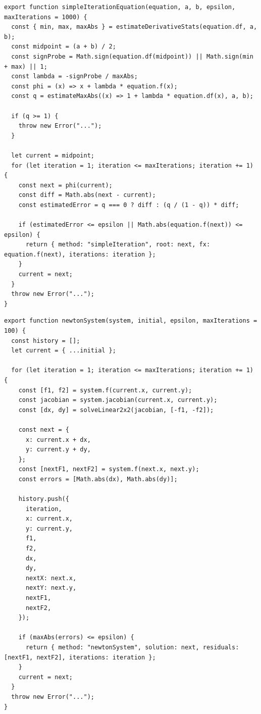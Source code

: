 \documentclass[12pt,a4paper]{article}
\begin{document}
\begin{lstlisting}[caption={Метод простой итерации (фрагмент \texttt{src/methods/equations.js})}]
export function simpleIterationEquation(equation, a, b, epsilon, maxIterations = 1000) {
  const { min, max, maxAbs } = estimateDerivativeStats(equation.df, a, b);
  const midpoint = (a + b) / 2;
  const signProbe = Math.sign(equation.df(midpoint)) || Math.sign(min + max) || 1;
  const lambda = -signProbe / maxAbs;
  const phi = (x) => x + lambda * equation.f(x);
  const q = estimateMaxAbs((x) => 1 + lambda * equation.df(x), a, b);

  if (q >= 1) {
    throw new Error("...");
  }

  let current = midpoint;
  for (let iteration = 1; iteration <= maxIterations; iteration += 1) {
    const next = phi(current);
    const diff = Math.abs(next - current);
    const estimatedError = q === 0 ? diff : (q / (1 - q)) * diff;

    if (estimatedError <= epsilon || Math.abs(equation.f(next)) <= epsilon) {
      return { method: "simpleIteration", root: next, fx: equation.f(next), iterations: iteration };
    }
    current = next;
  }
  throw new Error("...");
}
\end{lstlisting}

\begin{lstlisting}[caption={Метод Ньютона для системы (фрагмент \texttt{src/methods/systems.js})}]
export function newtonSystem(system, initial, epsilon, maxIterations = 100) {
  const history = [];
  let current = { ...initial };

  for (let iteration = 1; iteration <= maxIterations; iteration += 1) {
    const [f1, f2] = system.f(current.x, current.y);
    const jacobian = system.jacobian(current.x, current.y);
    const [dx, dy] = solveLinear2x2(jacobian, [-f1, -f2]);

    const next = {
      x: current.x + dx,
      y: current.y + dy,
    };
    const [nextF1, nextF2] = system.f(next.x, next.y);
    const errors = [Math.abs(dx), Math.abs(dy)];

    history.push({
      iteration,
      x: current.x,
      y: current.y,
      f1,
      f2,
      dx,
      dy,
      nextX: next.x,
      nextY: next.y,
      nextF1,
      nextF2,
    });

    if (maxAbs(errors) <= epsilon) {
      return { method: "newtonSystem", solution: next, residuals: [nextF1, nextF2], iterations: iteration };
    }
    current = next;
  }
  throw new Error("...");
}
\end{lstlisting}
\end{document}

